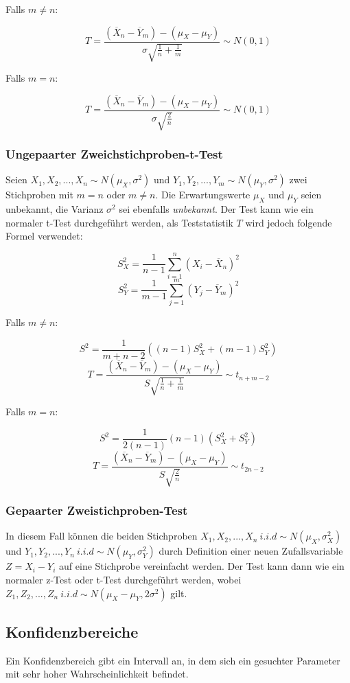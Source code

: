 \documentclass[10pt,a4paper,twocolumn]{article}
\begin{document}
\vspace{10pt}

Falls $m\neq n$:

\[
T = \frac{\left(\overline{X}_n-\overline{Y}_m\right)-\left(\mu_X-\mu_Y\right)}{\sigma\sqrt{\frac{1}{n}+\frac{1}{m}}}\sim N(0,1)
\]

Falls $m=n$:

\[
T = \frac{\left(\overline{X}_n-\overline{Y}_m\right)-\left(\mu_X-\mu_Y\right)}{\sigma\sqrt{\frac{2}{n}}}\sim N(0,1)
\]

\subsubsection{Ungepaarter Zweichstichproben-t-Test}
Seien $X_1,X_2,...,X_n \sim N(\mu_X,\sigma^2)$ und $Y_1,Y_2,...,Y_m \sim N(\mu_Y,\sigma^2)$ zwei Stichproben mit $m = n$ oder $m \neq n$. Die Erwartungswerte $\mu_X$ und $\mu_Y$ seien unbekannt, die Varianz $\sigma^2$ sei ebenfalls \emph{unbekannt}. Der Test kann wie ein normaler t-Test durchgeführt werden, als Teststatistik $T$ wird jedoch folgende Formel verwendet:

\[
S_{X}^{2}=\frac{1}{n-1}\sum\limits_{i=1}^{n}\left(X_i-\overline{X}_n\right)^2
\]
\[
S_{Y}^{2}=\frac{1}{m-1}\sum\limits_{j=1}^{m}\left(Y_j-\overline{Y}_m\right)^2
\]

Falls $m\neq n$:

\[
S^2=\frac{1}{m+n-2}\left((n-1)S_{X}^{2}+(m-1)S_{Y}^{2}\right)
\]
\[
T = \frac{\left(\overline{X}_n-\overline{Y}_m\right)-\left(\mu_X-\mu_Y\right)}{S\sqrt{\frac{1}{n}+\frac{1}{m}}}\sim t_{n+m-2}
\]

Falls $m=n$:

\[
S^2=\frac{1}{2(n-1)}(n-1)\left(S_{X}^{2}+S_{Y}^{2}\right)
\]
\[
T = \frac{\left(\overline{X}_n-\overline{Y}_m\right)-\left(\mu_X-\mu_Y\right)}{S\sqrt{\frac{2}{n}}}\sim t_{2n-2}
\]

\subsubsection{Gepaarter Zweistichproben-Test}
In diesem Fall können die beiden Stichproben $X_1,X_2,...,X_n\ i.i.d\sim N(\mu_X,\sigma_X^2)$ und $Y_1,Y_2,...,Y_n\ i.i.d\sim N(\mu_Y,\sigma_Y^2)$ durch Definition einer neuen Zufallsvariable $Z=X_i-Y_i$ auf eine Stichprobe vereinfacht werden. Der Test kann dann wie ein normaler z-Test oder t-Test durchgeführt werden, wobei $Z_1,Z_2,...,Z_n\ i.i.d\sim N(\mu_X-\mu_Y,2\sigma^2)$ gilt.

\subsection{Konfidenzbereiche}
Ein Konfidenzbereich gibt ein Intervall an, in dem sich ein gesuchter Parameter mit sehr hoher Wahrscheinlichkeit befindet.\\
\end{document}
